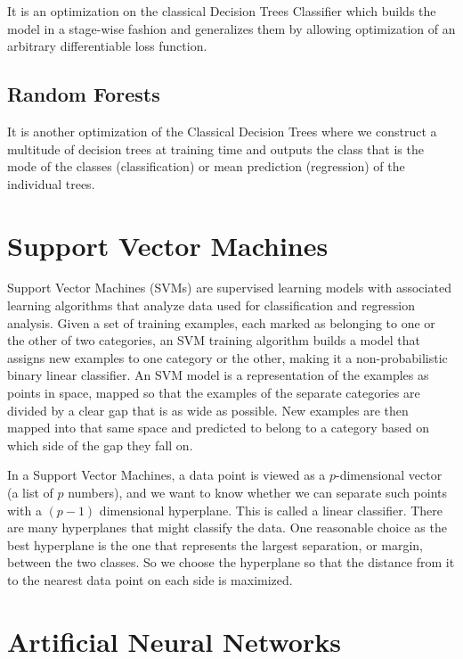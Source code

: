 It is an optimization on the classical Decision Trees Classifier which builds the model in a stage-wise  fashion and generalizes them by allowing optimization of an arbitrary differentiable loss function.

\subsection{Random Forests}
It is another optimization of the Classical Decision Trees where we construct a multitude of decision trees at training time and outputs the class that is the mode of the classes (classification) or mean prediction (regression) of the individual trees.


\section{Support Vector Machines}

Support Vector Machines (SVMs) are supervised learning models with associated learning algorithms that analyze data used for classification and regression analysis. Given a set of training examples, each marked as belonging to one or the other of two categories, an SVM training algorithm builds a model that assigns new examples to one category or the other, making it a non-probabilistic binary linear classifier. An SVM model is a representation of the examples as points in space, mapped so that the examples of the separate categories are divided by a clear gap that is as wide as possible. New examples are then mapped into that same space and predicted to belong to a category based on which side of the gap they fall on.


 In a Support Vector Machines, a data point is viewed as a $p$-dimensional vector (a list of $p$ numbers), and we want to know whether we can separate such points with a  $(p-1)$ dimensional hyperplane. This is called a linear classifier. There are many hyperplanes that might classify the data. One reasonable choice as the best hyperplane is the one that represents the largest separation, or margin, between the two classes. So we choose the hyperplane so that the distance from it to the nearest data point on each side is maximized.

\section{Artificial Neural Networks}

